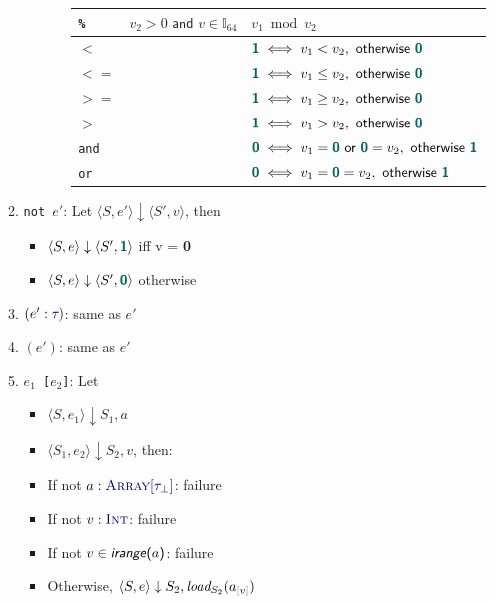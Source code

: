 \documentclass{article}
\newcommand{\tuple}[1]{\ensuremath{\langle #1 \rangle}}
\newcommand{\vterminal}[1]{\textsf{\textcolor{dgreen}{\texttt{#1}}}}
\newcommand{\Ty}[1]{\textcolor{dblue}{#1}}
\newcommand{\TInt}{\Ty{\textsc{Int}}}
\newcommand{\TArrayof}[1]{\Ty{\textsc{Array}[#1]}}
\newcommand{\Ttau}[1][{}]{\Ty{\tau_{#1}}}
\newcommand{\Vint}[1]{{\textsf{\textcolor{dcyan}{\textbf{#1}}}}}
\newcommand{\arrayindices}[1]{\textsf{\textit{irange}(#1)}}
\newcommand{\failure}{\textcolor{dred}{failure}}
\newcommand{\arrsub}[2]{#1_{\textcolor{gray}{[}#2\textcolor{gray}{]}}}
\begin{document}
\begin{enumerate}
\begin{enumerate}
\begin{itemize}
\begin{enumerate}
\begin{tabular}{|l|l|l|}
              \hline
              \vterminal{\%}	& $v_2 > 0 \textsf{ and }v \in \mathbb{I}_{64}$		& $v_1 \bmod v_2$ \\
              \hline
              \vterminal{$<$}	&&$ \Vint{1} \iff v_1 < v_2, \textsf{ otherwise } \Vint{0}$ \\
              \hline
              \vterminal{$<=$}	&&$ \Vint{1} \iff v_1 \le v_2, \textsf{ otherwise } \Vint{0}$ \\
              \hline
              \vterminal{$>=$}	&&$ \Vint{1} \iff v_1 \ge v_2, \textsf{ otherwise } \Vint{0}$ \\
              \hline
              \vterminal{$>$}	&&$ \Vint{1} \iff v_1 > v_2, \textsf{ otherwise } \Vint{0}$ \\
              \hline
              \vterminal{and}	&&$ \Vint{0} \iff v_1 = \Vint{0} \textsf{ or } \Vint{0} = v_2, \textsf{ otherwise } \Vint{1}$ \\
              \hline
              \vterminal{or}	&&$ \Vint{0} \iff v_1 = \Vint{0} = v_2, \textsf{ otherwise } \Vint{1}$ \\
              \hline
            \end{tabular}
        \end{enumerate}
    \end{itemize}
  \item \vterminal{not $e'$}: Let $\tuple{S, e'} \downarrow \tuple{S', v}$, then
    \begin{itemize}
      \item $\tuple{S, e} \downarrow \tuple{S', \Vint{1}}$ iff v = \Vint{0}
      \item $\tuple{S, e} \downarrow \tuple{S', \Vint{0}}$ otherwise
    \end{itemize}
  \item \vterminal{$(e' : \Ttau)$}: same as $e'$
  \item \vterminal{$(e')$}: same as $e'$
  \item \vterminal{$e_1$ [$e_2$]}: Let
    \begin{itemize}
      \item $\tuple{S, e_1} \downarrow {S_1, a}$
      \item $\tuple{S_1, e_2} \downarrow {S_2, v}$, then:
      \item If not $a : \TArrayof{\tau_\bot}$: \failure
      \item If not $v : \TInt$: \failure
      \item If not $v \in \arrayindices{$a$}$: \failure
      \item Otherwise, $\tuple{S, e} \downarrow {S_2, \textit{load}_{S_2}(\arrsub{a}{v})}$
    \end{itemize}


\end{enumerate}
\end{enumerate}
\end{document}
